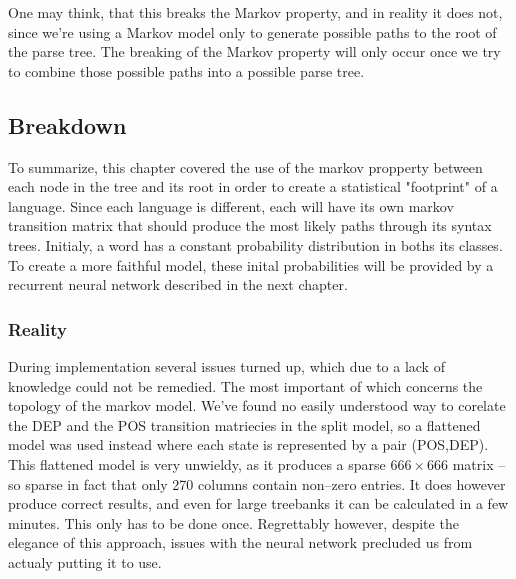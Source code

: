 One may think, that this breaks the Markov property, and in reality it does not, since we're using a Markov model only to generate possible paths to the root of the parse tree. The breaking of the Markov property will only occur once we try to combine those possible paths into a possible parse tree.
\clearpage

\subsection{Breakdown}
%
To summarize, this chapter covered the use of the markov propperty between each node in the tree and its root in order to create a statistical "footprint" of a language. Since each language is different, each will have its own markov transition matrix that should produce the most likely paths through its syntax trees. Initialy, a word has a constant probability distribution in boths its classes. To create a more faithful model, these inital probabilities will be provided by a recurrent neural network described in the next chapter.
\subsubsection{Reality}
During implementation several issues turned up, which due to a lack of knowledge could not be remedied. The most important of which concerns the topology of the markov model. We've found no easily understood way to corelate the DEP and the POS transition matriecies in the split model, so a flattened model was used instead where each state is represented by a pair (POS,DEP).
This flattened model is very unwieldy, as it produces a sparse $666\times666$ matrix -- so sparse in fact that only 270 columns contain non--zero entries. It does however produce correct results, and even for large treebanks it can be calculated in a few minutes. This only has to be done once.
Regrettably however, despite the elegance of this approach, issues with the neural network precluded us from actualy putting it to use.


